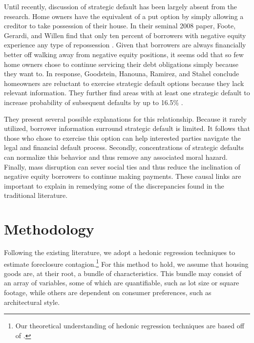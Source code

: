 \documentclass[12pt,oneside]{amsbook}
\begin{document}
	Until recently, discussion of strategic default has been largely absent from the research. Home owners have the equivalent of a put option by simply allowing a creditor to take possession of their house. In their seminal 2008 paper, Foote, Gerardi, and Willen find that only ten percent of borrowers with negative equity experience any type of repossession \cite{Foote}. Given that borrowers are always financially better off walking away from negative equity positions, it seems odd that so few home owners chose to continue servicing their debt obligations simply because they want to. In response, Goodstein, Hanouna, Ramirez, and Stahel conclude homeowners are reluctant to exercise strategic default options because they lack relevant information. They further find areas with at least one strategic default to increase probability of subsequent defaults by up to 16.5\% \cite{Strat}.
	
	They present several possible explanations for this relationship. Because it rarely utilized, borrower information surround strategic default is limited. It follows that those who chose to exercise this option can help interested parties navigate the legal and financial default process. Secondly, concentrations of strategic defaults can normalize this behavior and thus remove any associated moral hazard. Finally, mass disruption can sever social ties and thus reduce the inclination of negative equity borrowers to continue making payments. These causal links are important to explain in remedying some of the discrepancies found in the traditional literature.


\section{Methodology}\label{sec:method}
\indent Following the existing literature, we adopt a hedonic regression techniques to estimate foreclosure contagion.\footnote{Our theoretical understanding of hedonic regression techniques are based off of \cite{Hedonic} \cite{Monson} \cite{Diwert}. } For this method to hold, we assume that housing goods are, at their root, a bundle of characteristics. This bundle may consist of an array of variables, some of which are quantifiable, such as lot size or square footage, while others are dependent on consumer preferences, such as architectural style. 
\end{document}

